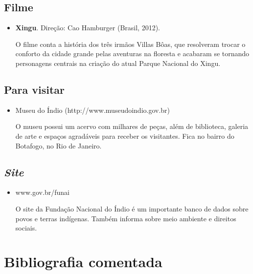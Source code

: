 \documentclass[12pt]{extarticle}
\begin{document}
\subsection{Filme}

\begin{itemize}
\item\textbf{Xingu}. Direção: Cao Hamburger (Brasil, 2012).

O filme conta a história dos três irmãos Villas Bôas, que resolveram
trocar o conforto da cidade grande pelas aventuras na floresta e
acabaram se tornando personagens centrais na criação do atual Parque
Nacional do Xingu.
\end{itemize}

\subsection{Para visitar}

\begin{itemize}
\item Museu do Índio (http://www.museudoindio.gov.br)

O museu possui um acervo com milhares de peças, além de biblioteca,
galeria de arte e espaços agradáveis para receber os visitantes. Fica no
bairro do Botafogo, no Rio de Janeiro.
\end{itemize}

\subsection{\emph{Site}}

\begin{itemize}
\item www.gov.br/funai

O site da Fundação Nacional do Índio é um importante banco de dados
sobre povos e terras indígenas. Também informa sobre meio ambiente e
direitos sociais.
\end{itemize}

\section{Bibliografia comentada}
\end{document}
